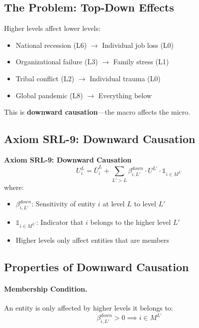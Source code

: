 \subsection{The Problem: Top-Down Effects}

Higher levels affect lower levels:
\begin{itemize}
\item National recession (L6) $\to$ Individual job loss (L0)
\item Organizational failure (L3) $\to$ Family stress (L1)
\item Tribal conflict (L2) $\to$ Individual trauma (L0)
\item Global pandemic (L8) $\to$ Everything below
\end{itemize}

This is \textbf{downward causation}---the macro affects the micro.

\subsection{Axiom SRL-9: Downward Causation}

\begin{tcolorbox}[colback=gray!5!white, colframe=gray!75!black]
\textbf{Axiom SRL-9: Downward Causation}
\begin{equation}
\boxed{
U^L_i = \bar{U}^L_i + \sum_{L' > L} \beta^{down}_{i,L'} \cdot U^{L'} \cdot \mathbb{1}_{i \in M^{L'}}
}
\end{equation}
where:
\begin{itemize}
\item $\beta^{down}_{i,L'}$: Sensitivity of entity $i$ at level $L$ to level $L'$
\item $\mathbb{1}_{i \in M^{L'}}$: Indicator that $i$ belongs to the higher level $L'$
\item Higher levels only affect entities that are members
\end{itemize}
\end{tcolorbox}

\subsection{Properties of Downward Causation}

\paragraph{Membership Condition.}
An entity is only affected by higher levels it belongs to:
\begin{equation}
\beta^{down}_{i,L'} > 0 \implies i \in M^{L'}
\end{equation}

